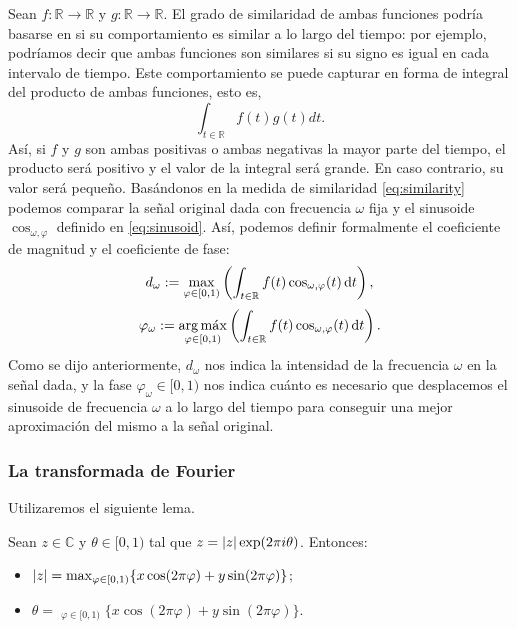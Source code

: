 \documentclass{article}
\DeclareMathOperator*{\argmax}{arg\,m \acute ax}
\begin{document}
Sean $f:\mathbb{R}\rightarrow\mathbb{R}$ y $g:\mathbb{R}\rightarrow\mathbb{R}$. El grado de similaridad de ambas funciones podría basarse en si su comportamiento es similar a lo largo del tiempo: por ejemplo, podríamos decir que ambas funciones son similares si su signo es igual en cada intervalo de tiempo. Este comportamiento se puede capturar en forma de integral del producto de ambas funciones, esto es,
\begin{equation}\label{eq:similarity}
\int_{t\in\mathbb{R}}f(t)g(t)dt.
\end{equation}
Así, si $f$ y $g$ son ambas positivas o ambas negativas la mayor parte del tiempo, el producto será positivo y el valor de la integral será grande. En caso contrario, su valor será pequeño.
\newline
Basándonos en la medida de similaridad \eqref{eq:similarity} podemos comparar la señal original dada con frecuencia $\omega$ fija y el sinusoide $\cos_{\omega,\varphi}$ definido en \eqref{eq:sinusoid}. Así, podemos definir formalmente el coeficiente de magnitud y el coeficiente de fase:
\begin{equation}\label{eq:magnitude}
d_{\omega}:=\max_{\varphi\in[0,1)}\left(\int_{t\in\mathbb{R}}f(t)\cos_{\omega,\varphi}(t)\,\mathrm{d} t\right),
\end{equation}
\begin{equation}\label{eq:phase}
\varphi_{\omega}:=\argmax_{\varphi\in[0,1)}\left(\int_{t\in\mathbb{R}}f(t)\cos_{\omega,\varphi}(t)\diff t\right).
\end{equation}
Como se dijo anteriormente, $d_\omega$ nos indica la intensidad de la frecuencia $\omega$ en la señal dada, y la fase $\varphi_\omega\in[0,1)$ nos indica cuánto es necesario que desplacemos el sinusoide de frecuencia $\omega$ a lo largo del tiempo para conseguir una mejor aproximación del mismo a la señal original.

\subsubsection{La transformada de Fourier}

Utilizaremos el siguiente lema.

\begin{lemma} \label{lem:complex_exp}Sean $z\in\mathbb{C}$ y $\theta\in[0,1)$ tal que $z=\abs{z}\exp(2\pi i\theta)$. Entonces:
\begin{itemize}
    \item $\abs{z}=\max_{\varphi\in[0,1)}\{x\cos(2\pi\varphi)+y\sin(2\pi\varphi)\}$;
    \item $\theta=\argmax_{\varphi\in[0,1)}\{x\cos(2\pi\varphi)+y\sin(2\pi\varphi)\}$.
\end{itemize}
\end{lemma}
\end{document}
